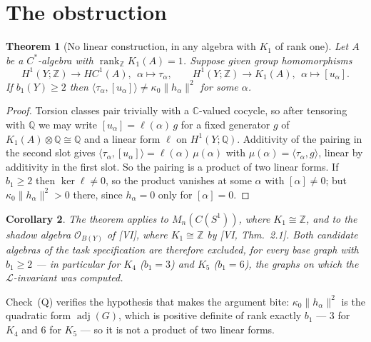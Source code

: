 \documentclass[11pt]{amsart}
\numberwithin{equation}{section}
\newtheorem{theorem}{Theorem}[section]
\newtheorem{corollary}[theorem]{Corollary}
\theoremstyle{definition}
\theoremstyle{remark}
\newcommand{\Z}{\mathbb{Z}}
\newcommand{\Q}{\mathbb{Q}}
\newcommand{\C}{\mathbb{C}}
\newcommand{\cL}{\mathcal{L}}
\newcommand{\rank}{\operatorname{rank}}
\begin{document}
\section{The obstruction}\label{sec:obstruction}

\begin{theorem}[No linear construction, in any algebra with $K_1$ of rank one]
\label{thm:obstruction}
Let $A$ be a $C^*$-algebra with $\rank_{\Z}K_1(A)=1$. Suppose given group homomorphisms
\[
H^1(Y;\Z)\to HC^1(A),\ \ \alpha\mapsto\tau_\alpha,
\qquad
H^1(Y;\Z)\to K_1(A),\ \ \alpha\mapsto[u_\alpha].
\]
If $b_1(Y)\ge2$ then $\langle\tau_\alpha,[u_\alpha]\rangle\ne\kappa_0\|h_\alpha\|^2$ for
some $\alpha$.
\end{theorem}

\begin{proof}
Torsion classes pair trivially with a $\C$-valued cocycle, so after tensoring with $\Q$
we may write $[u_\alpha]=\ell(\alpha)\,g$ for a fixed generator $g$ of
$K_1(A)\otimes\Q\cong\Q$ and a linear form $\ell$ on $H^1(Y;\Q)$. Additivity of the
pairing in the second slot gives
$\langle\tau_\alpha,[u_\alpha]\rangle=\ell(\alpha)\,\mu(\alpha)$ with
$\mu(\alpha)=\langle\tau_\alpha,g\rangle$, linear by additivity in the first slot. So the
pairing is a product of two linear forms. If $b_1\ge2$ then $\ker\ell\ne0$, so the product
vanishes at some $\alpha$ with $[\alpha]\ne0$; but $\kappa_0\|h_\alpha\|^2>0$ there, since
$h_\alpha=0$ only for $[\alpha]=0$.
\end{proof}

\begin{corollary}\label{cor:applies}
The theorem applies to $M_n(C(S^1))$, where $K_1\cong\Z$, and to the shadow algebra
$\mathcal O_{B(Y)}$ of [VI], where $K_1\cong\Z$ by [VI, Thm.~2.1]. Both candidate
algebras of the task specification are therefore excluded, for every base graph with
$b_1\ge2$ --- in particular for $K_4$ ($b_1=3$) and $K_5$ ($b_1=6$), the graphs on which
the $\cL$-invariant was computed.
\end{corollary}

Check~(Q) verifies the hypothesis that makes the argument bite: $\kappa_0\|h_\alpha\|^2$
is the quadratic form $\operatorname{adj}(G)$, which is positive definite of rank exactly
$b_1$ --- $3$ for $K_4$ and $6$ for $K_5$ --- so it is not a product of two linear forms.
\end{document}
